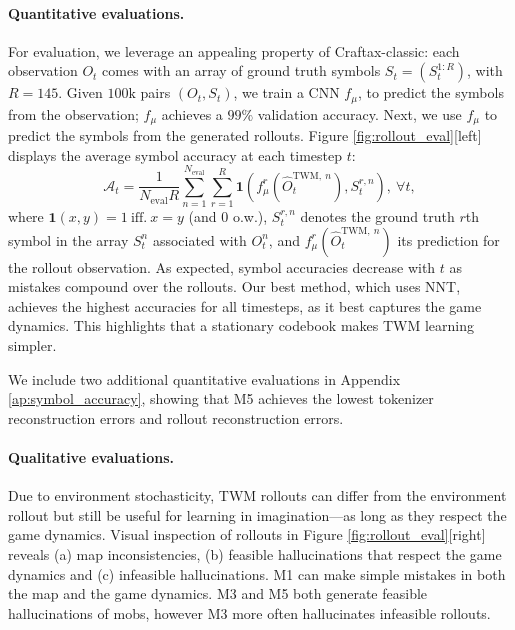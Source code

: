 \paragraph{Quantitative evaluations.}
For evaluation,
we leverage an appealing property of Craftax-classic: each observation $O_t$ comes with an array of ground truth symbols $S_t=(S_t^{1:R})$, with $R=145$. Given $100\text{k}$ pairs $(O_t, S_t)$, we train a CNN $f_{\mu}$, to predict the symbols from the observation; $f_{\mu}$ achieves a $99\%$ validation accuracy. Next, we use $f_{\mu}$ to predict the symbols from the generated rollouts. Figure \ref{fig:rollout_eval}[left] displays the average symbol accuracy at each timestep $t$:
\begin{equation*}
    \mathcal{A}_t = \frac{1}{N_{\text{eval}}R} \sum_{n=1}^{N_{\text{eval}}} \sum_{r=1}^{R}\mathbf{1}(f_{\mu}^r(\hat{O}^{\text{TWM},~n}_t), S^{r,n}_t), ~ \forall t,
\end{equation*}
where $\mathbf{1}(x,y) = 1 ~\text{iff.}~ x=y $ (and $0$ o.w.), $S^{r,n}_t$ denotes the ground truth $r$th symbol in the array $S^{n}_t$ associated with $O^n_t$, and $f_{\mu}^r(\hat{O}^{\text{TWM},~n}_t)$ its prediction for the rollout observation.
As expected, symbol accuracies decrease with $t$ as mistakes compound over the rollouts.
Our best method, which uses NNT, achieves the highest accuracies for all timesteps, as it best captures the game dynamics. This highlights that a stationary codebook makes TWM learning simpler.

We include two additional quantitative evaluations in Appendix \ref{ap:symbol_accuracy}, showing that M5 achieves the lowest tokenizer reconstruction errors and rollout reconstruction errors.




\paragraph{Qualitative evaluations.}
Due to environment stochasticity, TWM rollouts can differ from the environment rollout but still be useful for learning in imagination---as long as they respect the game dynamics.
Visual inspection of rollouts in Figure \ref{fig:rollout_eval}[right] reveals (a) map inconsistencies, (b) feasible hallucinations that respect the game dynamics and (c) infeasible hallucinations. 
M1 can make simple mistakes in both the map and the game dynamics. 
M3 and M5 both generate feasible hallucinations of mobs, however M3 more often hallucinates infeasible rollouts.



